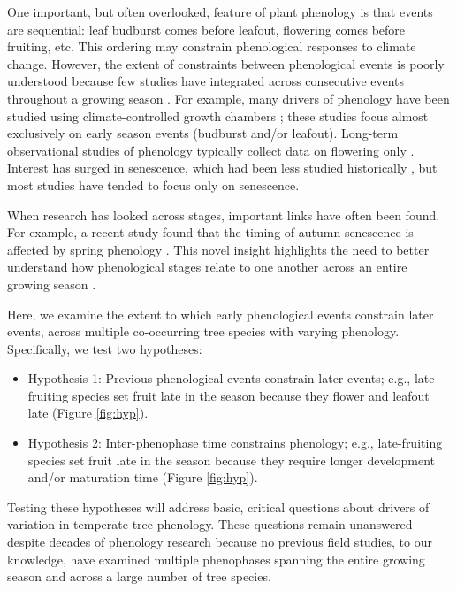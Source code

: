 \documentclass{article}
\begin{document}
\par One important, but often overlooked, feature of plant phenology is that events are sequential: leaf budburst comes before leafout, flowering comes before fruiting, etc. This ordering may constrain phenological responses to climate change. However, the extent of constraints between phenological events is poorly understood because few studies have integrated across consecutive events throughout a growing season \citep{wolkovich2014}. For example, many drivers of phenology have been studied using climate-controlled growth chambers \citep[e.g.,][]{basler2012, laube2014}; these studies focus almost exclusively on early season events (budburst and/or leafout).  Long-term observational studies of phenology typically collect data on flowering only  \citep [e.g. 64\% of studies in ][]{wolkovich2012nectar}. Interest has surged in senescence, which had been less studied historically \citep {parmesan2006}, but most studies have tended to focus only on senescence. %

\par When research has looked across stages, important links have often been found. For example, a recent study found that the timing of autumn senescence is affected by spring phenology \citep {keenan2015}. This novel insight highlights the need to better understand how phenological stages relate to one another across an entire growing season \citep{wolkovich2014}. %

\par Here, we examine the extent to which early phenological events constrain later events, across multiple co-occurring tree species with varying phenology. Specifically, we test two hypotheses:
\begin{itemize}
\item Hypothesis 1: Previous phenological events constrain later events; e.g., late-fruiting species set fruit late in the season because they flower and leafout late  (Figure \ref{fig:hyp}).
\item Hypothesis 2: Inter-phenophase time  constrains phenology; e.g., late-fruiting species set fruit late in the season because they require longer development and/or maturation time (Figure \ref{fig:hyp}). %
\end{itemize}
Testing these hypotheses will address basic, critical questions about drivers of variation in temperate tree phenology. These questions remain unanswered despite decades of phenology research because no previous field studies, to our knowledge, have examined multiple phenophases spanning the entire growing season and across a large number of tree species. 
\end{document}

